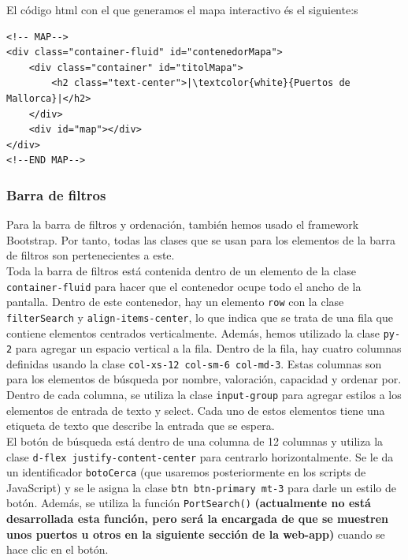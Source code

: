 \documentclass{article}
\begin{document}
\noindent El código html con el que generamos el mapa interactivo és el siguiente:s 
\begin{verbatim}
<!-- MAP-->
<div class="container-fluid" id="contenedorMapa">
    <div class="container" id="titolMapa">
        <h2 class="text-center">|\textcolor{white}{Puertos de Mallorca}|</h2>
    </div>
    <div id="map"></div>
</div>
<!--END MAP-->
\end{verbatim}

\subsubsection{Barra de filtros}
Para la barra de filtros y ordenación, también hemos usado el framework Bootstrap. Por tanto, todas las clases que se usan para los elementos de la barra de filtros son pertenecientes a este.\\

\noindent Toda la barra de filtros está contenida dentro de un elemento de la clase \texttt{container-fluid} para hacer que el contenedor ocupe todo el ancho de la pantalla. Dentro de este contenedor, hay un elemento \texttt{row} con la clase \texttt{filterSearch} y \texttt{align-items-center}, lo que indica que se trata de una fila que contiene elementos centrados verticalmente. Además, hemos utilizado la clase \texttt{py-2} para agregar un espacio vertical a la fila. Dentro de la fila, hay cuatro columnas definidas usando la clase \texttt{col-xs-12 col-sm-6 col-md-3}. Estas columnas son para los elementos de búsqueda por nombre, valoración, capacidad y ordenar por. Dentro de cada columna, se utiliza la clase \texttt{input-group} para agregar estilos a los elementos de entrada de texto y select. Cada uno de estos elementos tiene una etiqueta de texto que describe la entrada que se espera.\\

\noindent El botón de búsqueda está dentro de una columna de 12 columnas y utiliza la clase \texttt{d-flex justify-content-center} para centrarlo horizontalmente. Se le da un identificador \texttt{botoCerca} (que usaremos posteriormente en los scripts de JavaScript) y se le asigna la clase \texttt{btn btn-primary mt-3} para darle un estilo de botón. Además, se utiliza la función \texttt{PortSearch()} \textbf{(actualmente no está desarrollada esta función, pero será la encargada de que se muestren unos puertos u otros en la siguiente sección de la web-app)} cuando se hace clic en el botón.
\end{document}

